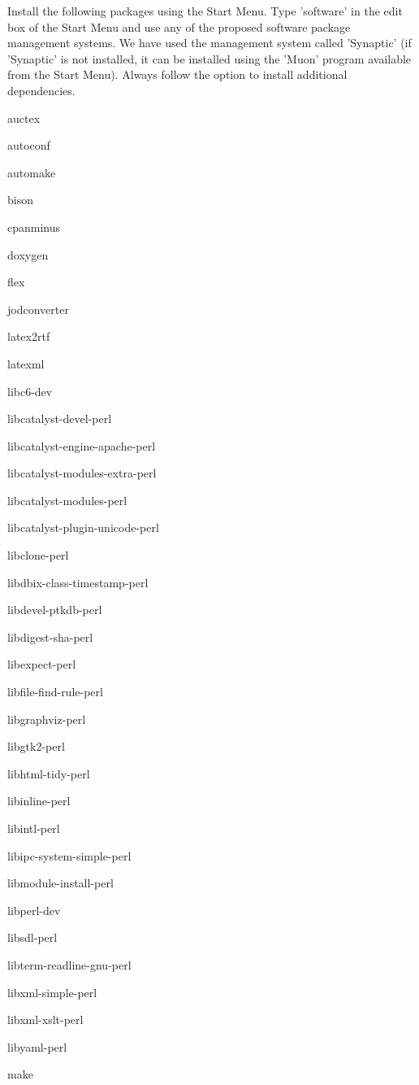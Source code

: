 \documentclass[12pt]{article}
\begin{document}
Install the following packages using the Start Menu.  Type 'software'
in the edit box of the Start Menu and use any of the proposed software
package management systems.  We have used the management system called
'Synaptic' (if 'Synaptic' is not installed, it can be installed using
the 'Muon' program available from the Start Menu).  Always follow the
option to install additional dependencies.
\begin{description} 
\item auctex
\item autoconf
\item automake
\item bison
\item cpanminus
\item doxygen
\item flex
\item jodconverter
\item latex2rtf
\item latexml 
\item libc6-dev
\item libcatalyst-devel-perl
\item libcatalyst-engine-apache-perl
\item libcatalyst-modules-extra-perl
\item libcatalyst-modules-perl

\item libcatalyst-plugin-unicode-perl

\item libclone-perl
\item libdbix-class-timestamp-perl
\item libdevel-ptkdb-perl
\item libdigest-sha-perl
\item libexpect-perl
\item libfile-find-rule-perl
\item libgraphviz-perl
\item libgtk2-perl
\item libhtml-tidy-perl
\item libinline-perl
\item libintl-perl
\item libipc-system-simple-perl
\item libmodule-install-perl
\item libperl-dev
\item libsdl-perl
\item libterm-readline-gnu-perl
\item libxml-simple-perl
\item libxml-xslt-perl
\item libyaml-perl
\item make


\end{description}
\end{document}
